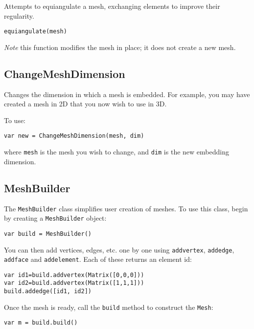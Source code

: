 Attempts to equiangulate a mesh, exchanging elements to improve their
regularity.

\begin{lstlisting}
equiangulate(mesh)
\end{lstlisting}

\emph{Note} this function modifies the mesh in place; it does not create
a new mesh.

\hypertarget{changemeshdimension}{%
\subsection{ChangeMeshDimension}\label{changemeshdimension}}

Changes the dimension in which a mesh is embedded. For example, you may
have created a mesh in 2D that you now wish to use in 3D.

To use:

\begin{lstlisting}
var new = ChangeMeshDimension(mesh, dim)
\end{lstlisting}

where \texttt{mesh} is the mesh you wish to change, and \texttt{dim} is
the new embedding dimension.

\hypertarget{meshbuilder}{%
\subsection{MeshBuilder}\label{meshbuilder}}

The \texttt{MeshBuilder} class simplifies user creation of meshes. To
use this class, begin by creating a \texttt{MeshBuilder} object:

\begin{lstlisting}
var build = MeshBuilder()
\end{lstlisting}

You can then add vertices, edges, etc. one by one using
\texttt{addvertex}, \texttt{addedge}, \texttt{addface} and
\texttt{addelement}. Each of these returns an element id:

\begin{lstlisting}
var id1=build.addvertex(Matrix([0,0,0]))
var id2=build.addvertex(Matrix([1,1,1]))
build.addedge([id1, id2])
\end{lstlisting}

Once the mesh is ready, call the \texttt{build} method to construct the
\texttt{Mesh}:

\begin{lstlisting}
var m = build.build()
\end{lstlisting}

